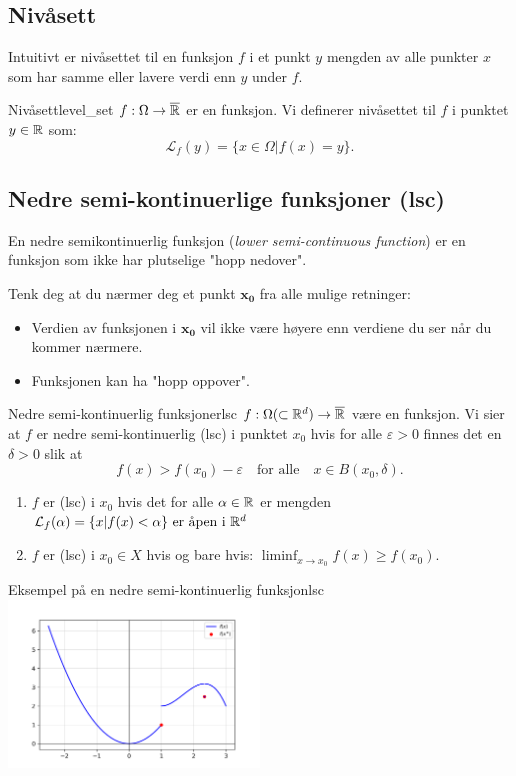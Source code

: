 \documentclass[10pt, a4paper]{article}
\begin{document}
\subsection{Nivåsett}
Intuitivt er nivåsettet til en funksjon \( f \) i et punkt \( y \) mengden av alle punkter \( x \) som har samme eller lavere verdi enn \( y \) under \( f \).
\begin{definition}{Nivåsett}{level_set}
  \(f: \Omega \to \overline{\mathbb{R}}\) er en funksjon. Vi definerer nivåsettet til \(f\) i punktet \(y \in \mathbb{R}\) som:
  \[
    \mathcal{L}_f(y) = \{x \in \Omega | f(x) = y\}.
  \]
\end{definition}

\subsection{Nedre semi-kontinuerlige funksjoner (lsc)}

En nedre semikontinuerlig funksjon (\textit{lower semi-continuous function}) er en funksjon som ikke har plutselige "hopp nedover".

Tenk deg at du nærmer deg et punkt \( \symbf{x_0} \) fra alle mulige retninger:
\begin{itemize}
  \item Verdien av funksjonen i \( \symbf{x_0} \) vil ikke være høyere enn verdiene du ser når du kommer nærmere.
  \item Funksjonen kan ha "hopp oppover".
\end{itemize}


\begin{definition}{Nedre semi-kontinuerlig funksjoner}{lsc}
  \(f: \Omega (\subset \mathbb{R}^d) \to \overline{\mathbb{R}}\) være en funksjon. Vi sier at \(f\) er nedre semi-kontinuerlig (lsc) i punktet \(x_0\) hvis for alle \(\varepsilon > 0\) finnes det en \(\delta > 0\) slik at
  \[
    f(x) > f(x_0) - \varepsilon \quad \text{for alle} \quad x \in B(x_0, \delta).
  \]
  \begin{enumerate}
    \item \(f\) er (lsc) i \(x_0\) hvis det for alle \(\alpha \in \mathbb{R}\) er mengden \(\mathcal{L}_f(\alpha) = \{x | f(x) < \alpha \} \text{ er åpen i } \mathbb{R}^d\)
    \item \(f\) er (lsc) i \(x_0 \in X\) hvis og bare hvis: \(\liminf_{x \to x_0} f(x) \geq f(x_0)\).
  \end{enumerate}
\end{definition}
\begin{example}{Eksempel på en nedre semi-kontinuerlig funksjon}{lsc}
    \includegraphics[width=0.5\textwidth]{figures/example_lsc.png}
\end{example}
\end{document}
